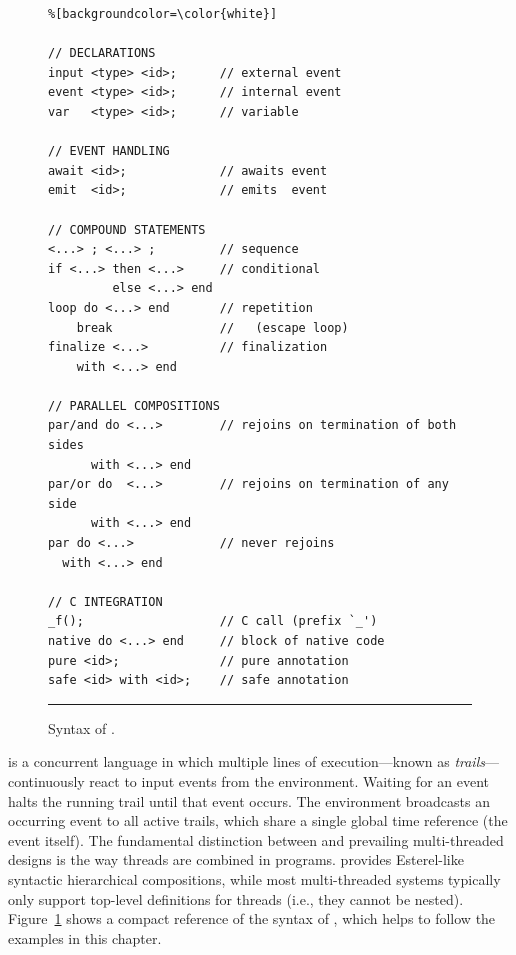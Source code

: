 
\begin{figure}[t]
\begin{lstlisting}%[backgroundcolor=\color{white}]

// DECLARATIONS
input <type> <id>;      // external event
event <type> <id>;      // internal event
var   <type> <id>;      // variable

// EVENT HANDLING
await <id>;             // awaits event
emit  <id>;             // emits  event

// COMPOUND STATEMENTS
<...> ; <...> ;         // sequence
if <...> then <...>     // conditional
         else <...> end
loop do <...> end       // repetition
    break               //   (escape loop)
finalize <...>          // finalization
    with <...> end

// PARALLEL COMPOSITIONS
par/and do <...>        // rejoins on termination of both sides
      with <...> end
par/or do  <...>        // rejoins on termination of any side
      with <...> end
par do <...>            // never rejoins
  with <...> end

// C INTEGRATION
_f();                   // C call (prefix `_')
native do <...> end     // block of native code
pure <id>;              // pure annotation
safe <id> with <id>;    // safe annotation
\end{lstlisting}
\rule{14cm}{0.37pt}
\caption{ Syntax of \CEU.\newline
{\small %
}%
\label{lst.syntax}
}
\end{figure}

\CEU is a concurrent language in which multiple lines of execution---known as 
\emph{trails}---continuously react to input events from the environment.
Waiting for an event halts the running trail until that event occurs.
The environment broadcasts an occurring event to all active trails, which share 
a single global time reference (the event itself).
%
%
The fundamental distinction between \CEU and prevailing multi-threaded designs 
is the way threads are combined in programs.
\CEU provides Esterel-like syntactic hierarchical compositions, while most 
multi-threaded systems typically only support top-level definitions for threads 
(i.e., they cannot be nested).
Figure~\ref{lst.syntax} shows a compact reference of the syntax of \CEU, which 
helps to follow the examples in this chapter.

